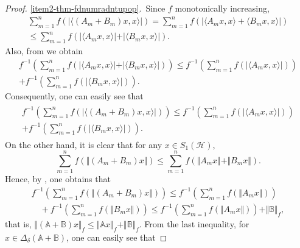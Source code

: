 \documentclass[12pt]{article}
\begin{document}
\begin{proof}
\noindent \ref{item2-thm-fdnumradntupop}.\ Since $ f $ monotonically increasing,
\begin{multline*}
\sum\limits_{m=1}^{n}f\left( \vert \langle (A_{m}+B_{m})x,x\rangle \vert \right)  =  \sum\limits_{m=1}^{n}f\left( \vert \langle A_{m}x,x\rangle + \langle B_{m}x,x\rangle \vert \right)  \\
\leq  \sum\limits_{m=1}^{n}f\left( \vert \langle A_{m}x,x\rangle\vert + \vert\langle B_{m}x,x\rangle \vert \right).
\end{multline*}
Also, from \cite{Mulholland1950} we obtain
\begin{multline*}
f^{-1} \left(  \sum\limits_{m=1}^{n}f\left( \vert \langle A_{m}x,x\rangle\vert + \vert\langle B_{m}x,x\rangle \vert \right) \right) \leq f^{-1} \left(  \sum\limits_{m=1}^{n}f\left( \vert \langle A_{m}x,x\rangle\vert \right) \right) \\
+ f^{-1} \left(  \sum\limits_{m=1}^{n}f\left( \vert \langle B_{m}x,x\rangle\vert \right) \right).
\end{multline*}
Consequently, one can easily see that
\begin{eqnarray}
\label{equ5}
\begin{array}{r}
f^{-1} \left( \sum\limits_{m=1}^{n}f\left( \vert \langle (A_{m}+B_{m})x,x\rangle \vert \right)  \right) \leq f^{-1} \left(  \sum\limits_{m=1}^{n}f\left( \vert \langle A_{m}x,x\rangle\vert \right) \right) \\
+ f^{-1} \left(  \sum\limits_{m=1}^{n}f\left( \vert \langle B_{m}x,x\rangle\vert \right) \right).
\end{array}
\end{eqnarray}
On the other hand, it is clear that for any $x \in S_{1}(\mathcal{H})$,
\[
\sum\limits_{m=1}^n f\left( \Vert (A_m + B_m)x \Vert \right) \leq
\sum\limits_{m=1}^n f\left(  \Vert A_m x\Vert + \Vert B_m x\Vert \right) .
\]
Hence, by \cite[Corollary 1.1]{Mulholland1950}, one obtains that
\begin{multline*}
f^{-1}\left(
\sum\limits_{m=1}^n f\left( \Vert(A_m + B_m)x\Vert\right)
\right)
\leq
f^{-1}\left(
\sum\limits_{m=1}^n f\left(  \Vert A_m x\Vert \right)
\right) \\
 \quad +
f^{-1}\left(
\sum\limits_{m=1}^n f\left( \Vert B_m x\Vert\right)
\right) \leq
f^{-1}\left(
\sum\limits_{m=1}^n f\left(  \Vert A_m x\Vert \right)
\right)
+
\Vert \mathbb{B} \Vert_{f},
\end{multline*}
that is,
\(
\Vert (\mathbb{A}+\mathbb{B})x\Vert_f
\leq
\Vert \mathbb{A}x\Vert_f + \Vert \mathbb{B}\Vert_f.
\)
From the last inequality, for $x \in \Delta_{\delta}({\mathbb{A}+\mathbb{B}})$, one can easily see that

\end{proof}
\end{document}
